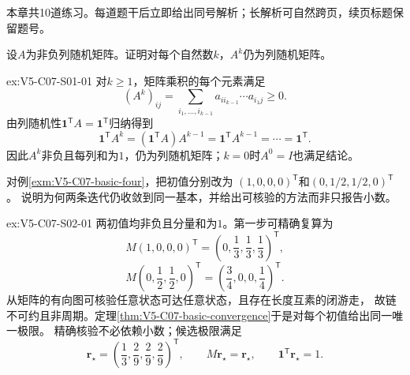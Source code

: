 \label{struct:V5-C07-CH33}
\label{struct:V5-C07-CH34}
\begin{chapterexercisebox}
\label{struct:V5-C07-CH35}
本章共10道练习。每道题干后立即给出同号解析；长解析可自然跨页，续页标题保留题号。
\end{chapterexercisebox}

\begin{SLChapterExercisePairSection}

\SLSourceBookExercises

\begin{exercise}\label{ex:V5-C07-S01-01}
设$A$为非负列随机矩阵。证明对每个自然数$k$，$A^k$仍为列随机矩阵。
\end{exercise}
\ifSLFullEdition
{}\label{sol:V5-C07-S01-01}
\begin{chapterexercisesolution}{ex:V5-C07-S01-01}
对$k\ge1$，矩阵乘积的每个元素满足
\[
(A^k)_{ij}=\sum_{i_1,\ldots,i_{k-1}}
a_{ii_{k-1}}\cdots a_{i_1j}\ge0.
\]
由列随机性$\boldsymbol1^{\mathsf T}A=\boldsymbol1^{\mathsf T}$归纳得到
\[
\boldsymbol1^{\mathsf T}A^k
=(\boldsymbol1^{\mathsf T}A)A^{k-1}
=\boldsymbol1^{\mathsf T}A^{k-1}
=\cdots=\boldsymbol1^{\mathsf T}.
\]
因此$A^k$非负且每列和为$1$，仍为列随机矩阵；$k=0$时$A^0=I$也满足结论。
\end{chapterexercisesolution}
\fi

\begin{exercise}\label{ex:V5-C07-S02-01}
对例\ref{exm:V5-C07-basic-four}，把初值分别改为
$(1,0,0,0)^{\mathsf T}$和$(0,1/2,1/2,0)^{\mathsf T}$。
说明为何两条迭代仍收敛到同一基本\PageRank{}，并给出可核验的方法而非只报告小数。
\end{exercise}
\ifSLFullEdition
{}\label{sol:V5-C07-S02-01}
\begin{chapterexercisesolution}{ex:V5-C07-S02-01}
两初值均非负且分量和为$1$。第一步可精确复算为
\[
M(1,0,0,0)^{\mathsf T}
=\left(0,\frac13,\frac13,\frac13\right)^{\mathsf T},
\]
\[
M\left(0,\frac12,\frac12,0\right)^{\mathsf T}
=\left(\frac34,0,0,\frac14\right)^{\mathsf T}.
\]
从矩阵的有向图可核验任意状态可达任意状态，且存在长度互素的闭游走，
故链不可约且非周期。定理\ref{thm:V5-C07-basic-convergence}于是对每个初值给出同一唯一极限。
精确核验不必依赖小数；候选极限满足
\[
\boldsymbol r_\star=\left(\frac13,\frac29,\frac29,\frac29\right)^{\mathsf T},
\qquad M\boldsymbol r_\star=\boldsymbol r_\star,\qquad
\boldsymbol1^{\mathsf T}\boldsymbol r_\star=1.
\]
\end{chapterexercisesolution}
\fi


\end{SLChapterExercisePairSection}
